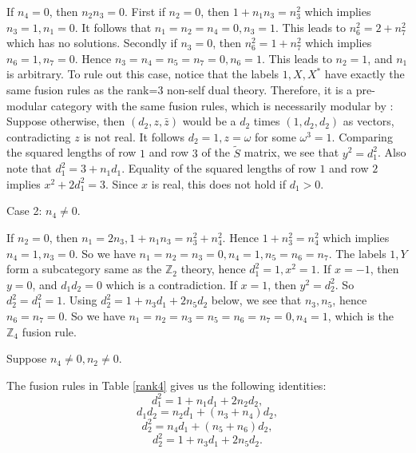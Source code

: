 \documentclass[12pt,psamsfonts]{amsart}
\newcommand{\Z}{\mathbb Z}
\newcommand{\tS}{\tilde{S}}
\numberwithin{equation}{section}
\theoremstyle{definition}
\begin{document}
 If $n_4=0$, then $n_2n_3=0$.  First if $n_2=0$, then
 $1+n_1n_3=n_3^2$ which implies $n_3=1,n_1=0$.  It follows that
 $n_1=n_2=n_4=0,n_3=1$.  This leads to $n_6^2=2+n_7^2$ which has
 no solutions.  Secondly if $n_3=0$, then $n_6^2=1+n_7^2$ which
 implies $n_6=1,n_7=0$.  Hence $n_3=n_4=n_5=n_7=0, n_6=1$.  This
 leads to $n_2=1$, and $n_1$ is arbitrary.
To rule out this case, notice that the labels $1,X,X^*$
 have exactly the same fusion rules as the rank=$3$ non-self dual
 theory.  Therefore, it is a pre-modular category with the same
 fusion rules, which is necessarily modular by \cite{Br}:
 Suppose otherwise, then $(d_2,z,\bar{z})$ would be a
 $d_2$ times $(1,d_2,d_2)$ as vectors, contradicting $z$ is not real.
 It follows $d_2=1, z=\omega$ for some $\omega^3=1$.  Comparing
 the squared lengths of row $1$ and row $3$ of the $\tS$ matrix, we see that $y^2=d_1^2$.  Also
 note that $d_1^2=3+n_1d_1$.  Equality of the squared lengths of row
 $1$ and row $2$ implies $x^2+2d_1^2=3$.  Since $x$ is real, this
 does not hold if $d_1>0$.


 Case 2: $n_4\neq 0$.

 If $n_2=0$, then $n_1=2n_3, 1+n_1n_3=n_3^2+n_4^2.$  Hence
 $1+n_3^2=n_4^2$ which implies $n_4=1,n_3=0$.  So we have
 $n_1=n_2=n_3=0, n_4=1,n_5=n_6=n_7$.  The labels $1,Y$ form a
 subcategory same as the $\Z_2$ theory, hence $d_1^2=1,x^2=1$.
 If $x=-1$, then $y=0$, and $d_1d_2=0$ which is a contradiction.
 If $x=1$, then $y^2=d_2^2$.  So $d_2^2=d_1^2=1$.
 Using $d_2^2=1+n_3d_1+2n_5d_2$ below, we see that $n_3,n_5$, hence
 $n_6=n_7=0$.  So we have $n_1=n_2=n_3=n_5=n_6=n_7=0, n_4=1$,
 which is the $\Z_4$ fusion rule.

 Suppose $n_4\neq 0, n_2\neq 0$.

 The fusion rules in Table \ref{rank4} gives us the following identities:
 \begin{equation}
 d_1^2=1+n_1d_1+2n_2d_2,
 \end{equation}
 \begin{equation}\label{d1d2product}
 d_1d_2=n_2d_1+(n_3+n_4)d_2,
 \end{equation}
 \begin{equation}\label{d2square}
 d_2^2=n_4d_1+(n_5+n_6)d_2,
 \end{equation}
 \begin{equation}
 d_2^2=1+n_3d_1+2n_5d_2.
 \end{equation}
\end{document}
